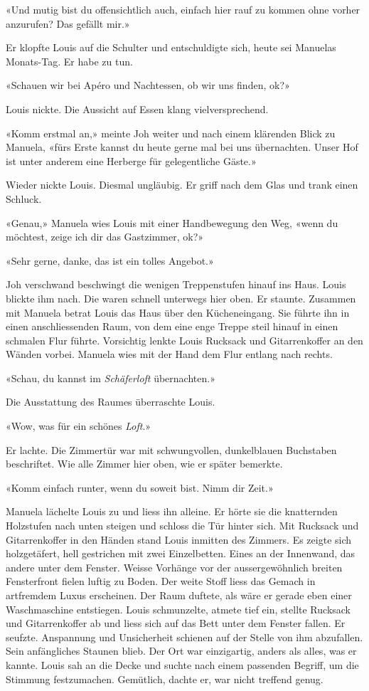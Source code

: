 «Und mutig bist du offensichtlich auch, einfach hier rauf zu kommen ohne
vorher anzurufen? Das gefällt mir.»

Er klopfte Louis auf die Schulter und entschuldigte sich, heute sei
Manuelas Monats-Tag. Er habe zu tun.

«Schauen wir bei Apéro und Nachtessen, ob wir uns finden, ok?»

Louis nickte. Die Aussicht auf Essen klang vielversprechend.

«Komm erstmal an,» meinte Joh weiter und nach einem klärenden Blick zu
Manuela, «fürs Erste kannst du heute gerne mal bei uns übernachten.
Unser Hof ist unter anderem eine Herberge für gelegentliche Gäste.»

Wieder nickte Louis. Diesmal ungläubig. Er griff nach dem Glas und trank
einen Schluck.

«Genau,» Manuela wies Louis mit einer Handbewegung den Weg, «wenn du
möchtest, zeige ich dir das Gastzimmer, ok?»

«Sehr gerne, danke, das ist ein tolles Angebot.»

Joh verschwand beschwingt die wenigen Treppenstufen hinauf ins Haus.
Louis blickte ihm nach. Die waren schnell unterwegs hier oben. Er staunte.
Zusammen mit Manuela betrat Louis das Haus über den Kücheneingang. Sie
führte ihn in einen anschliessenden Raum, von dem eine enge Treppe steil
hinauf in einen schmalen Flur führte. Vorsichtig lenkte Louis Rucksack
und Gitarrenkoffer an den Wänden vorbei. Manuela wies mit der Hand dem
Flur entlang nach rechts.

«Schau, du kannst im \emph{Schäferloft} übernachten.»

Die Ausstattung des Raumes überraschte Louis.

«Wow, was für ein schönes \emph{Loft}.»

Er lachte.
Die Zimmertür war mit schwungvollen, dunkelblauen Buchstaben
beschriftet. Wie alle Zimmer hier oben, wie er später bemerkte.

«Komm einfach runter, wenn du soweit bist. Nimm dir Zeit.»

Manuela lächelte Louis zu und liess ihn alleine. Er hörte sie die
knatternden Holzstufen nach unten steigen und schloss die Tür hinter
sich.
Mit Rucksack und Gitarrenkoffer in den Händen stand Louis inmitten des
Zimmers. Es zeigte sich holzgetäfert, hell gestrichen mit zwei
Einzelbetten. Eines an der Innenwand, das andere unter dem Fenster.
Weisse Vorhänge vor der aussergewöhnlich breiten Fensterfront fielen
luftig zu Boden. Der weite Stoff liess das Gemach in artfremdem Luxus
erscheinen. Der Raum duftete, als wäre er gerade eben einer Waschmaschine 
entstiegen. Louis schmunzelte, atmete tief ein, stellte Rucksack und Gitarrenkoffer ab 
und liess sich auf das Bett unter dem Fenster fallen. Er seufzte. Anspannung und
Unsicherheit schienen auf der Stelle von ihm abzufallen. Sein
anfängliches Staunen blieb. Der Ort war einzigartig, anders als alles, was
er kannte. Louis sah an die Decke und suchte nach einem passenden
Begriff, um die Stimmung festzumachen. Gemütlich, dachte er, war nicht
treffend genug. 

